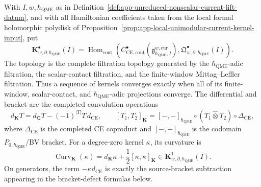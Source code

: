 \begin{defn}
\label{def:app-bulk-defect-convolution-complex}
  With \(I,w,\hbar_{\mathrm{QME}}\) as in
  Definition~\ref{def:app-unreduced-nonscalar-current-lift-datum}, and
  with all Hamiltonian coefficients taken from the local formal
  holomorphic polydisk of
  Proposition~\ref{prop:app-local-unimodular-current-kernel-input}, put
  \[
    \mathbf K^\bullet_{w,\partial,\hbar_{\mathrm{QME}}}(I)
      =
      \operatorname{Hom}_{\mathrm{cont}}\!\left(
      C^\bullet_{\mathrm{CE},\mathrm{cont}}
      (\mathfrak g^{w,\mathrm{cur}}_{\hbar_{\mathrm{QME}},I}),
      \mathfrak Q^\bullet_{w,\partial,\hbar_{\mathrm{QME}}}(I)\right).
  \]
  The topology is the complete filtration topology generated by the
  \(\hbar_{\mathrm{QME}}\)-adic filtration, the scalar-contact filtration, and the
  finite-window Mittag--Leffler filtration.  Thus a sequence of kernels
  converges exactly when all of its finite-window, scalar-contact, and
  \(\hbar_{\mathrm{QME}}\)-adic projections converge.  The differential and bracket are
  the completed convolution operations
  \[
    d_{\mathbf K}T=d_{\mathfrak Q}T-(-1)^{|T|}T\,d_{\mathrm{CE}},
    \qquad
    [T_1,T_2]_{\mathbf K}
      =[-,-]_{\hbar_{\mathrm{QME}}}\circ(T_1\widehat\otimes T_2)\circ\Delta_{\mathrm{CE}},
  \]
  where \(\Delta_{\mathrm{CE}}\) is the completed CE coproduct and
  \([-,-]_{\hbar_{\mathrm{QME}}}\) is the codomain \(P_{0,\hbar_{\mathrm{QME}}}\)/BV bracket.  For a
  degree-zero kernel \(\kappa\), its curvature is
  \[
    \operatorname{Curv}_{\mathbf K}(\kappa)
      =
      d_{\mathbf K}\kappa
      +\frac12[\kappa,\kappa]_{\mathbf K}
      \in \mathbf K^1_{w,\partial,\hbar_{\mathrm{QME}}}(I).
  \]
  On generators, the term \(-\kappa d_{\mathrm{CE}}\) is exactly the
  source-bracket subtraction appearing in the bracket-defect formulas
  below.
\end{defn}

